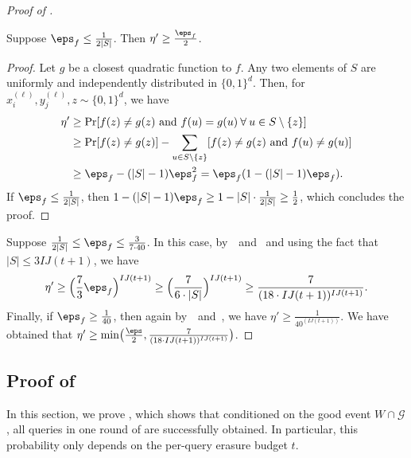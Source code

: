 \documentclass{toc}
\begin{document}
\begin{proof}[Proof of ]
 \begin{claim} \label{clm:small_eps}
 Suppose $\eps_f \leq \frac{1}{2|S|}$. Then $\eta' \geq \frac{\eps_f}{2}$.
 \end{claim}
 \begin{proof}
 Let $g$ be a closest quadratic function to $f$. Any two elements of $S$ are uniformly and independently distributed in $\{0,1\}^d$. Then, for $x_i^{(\ell)}, y_j^{(\ell)}, z \sim \{0,1\}^d$, we have
 \begin{align*}
     \eta' &\geq \Pr[f(z) \neq g(z) \text{ and } f(u) = g(u) \:\forall\: u \in S\setminus \{z\}] \\
     &\geq \Pr[f(z) \neq g(z)] - \sum_{u \in S\setminus\{z\}}[f(z) \neq g(z) \text{ and } f(u) \neq g(u)] \\
     &\geq \eps_f - (|S|-1)\eps_f^2 = \eps_f(1 - (|S|-1)\eps_f).
 \end{align*}
 If $\eps_f \leq \frac{1}{2|S|}$, then $1 - (|S|-1)\eps_f \geq 1 - |S| \cdot \frac{1}{2|S|} \geq \frac{1}{2}$, which concludes the proof. 
 \end{proof}
 
 Suppose $\frac{1}{2|S|} \leq \eps_f \leq \frac{3}{7\cdot 40}$. In this case, by~~and~ and using the fact that $|S| \leq 3IJ(t+1)$, we have 
 \begin{align*}
 \eta' \geq \Big(\frac{7}{3}\eps_f\Big)^{IJ(t+1)} \geq \Big(\frac{7}{6\cdot |S|}\Big)^{IJ(t+1)} \geq  \frac{7}{(18  \cdot IJ(t+1))^{IJ(t+1)}}.
 \end{align*}
 Finally, if $\eps_f \geq \frac{1}{40}$, then again by~~and~, we have $\eta' \geq \frac{1}{40^{(IJ(t+1))}}$. We have obtained that $\eta' \geq \min \bigl( \frac{\eps}{2}, \frac{7}{(18 \cdot IJ(t+1))^{I J (t+1)}} \bigr)$. 
\end{proof}
 

\subsection{Proof of } \label{sec:lem_erasures}

In this section, we prove , which shows that conditioned on the good event $W \cap \mathcal{G}$, all queries in one round of  are successfully obtained. In particular, this probability only depends on the per-query erasure budget $t$. 
\end{document}
